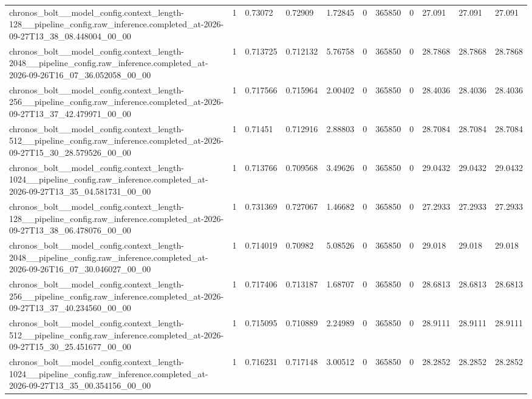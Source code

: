 \begin{tabular}{lllllllllll}
chronos\_bolt\_\_model\_config.context\_length-128\_\_pipeline\_config.raw\_inference.completed\_at-2026-09-27T13\_38\_08.448004\_00\_00 & 1 & 0.73072 & 0.72909 & 1.72845 & 0 & 365850 & 0 & 27.091 & 27.091 & 27.091 \\
chronos\_bolt\_\_model\_config.context\_length-2048\_\_pipeline\_config.raw\_inference.completed\_at-2026-09-26T16\_07\_36.052058\_00\_00 & 1 & 0.713725 & 0.712132 & 5.76758 & 0 & 365850 & 0 & 28.7868 & 28.7868 & 28.7868 \\
chronos\_bolt\_\_model\_config.context\_length-256\_\_pipeline\_config.raw\_inference.completed\_at-2026-09-27T13\_37\_42.479971\_00\_00 & 1 & 0.717566 & 0.715964 & 2.00402 & 0 & 365850 & 0 & 28.4036 & 28.4036 & 28.4036 \\
chronos\_bolt\_\_model\_config.context\_length-512\_\_pipeline\_config.raw\_inference.completed\_at-2026-09-27T15\_30\_28.579526\_00\_00 & 1 & 0.71451 & 0.712916 & 2.88803 & 0 & 365850 & 0 & 28.7084 & 28.7084 & 28.7084 \\
chronos\_bolt\_\_model\_config.context\_length-1024\_\_pipeline\_config.raw\_inference.completed\_at-2026-09-27T13\_35\_04.581731\_00\_00 & 1 & 0.713766 & 0.709568 & 3.49626 & 0 & 365850 & 0 & 29.0432 & 29.0432 & 29.0432 \\
chronos\_bolt\_\_model\_config.context\_length-128\_\_pipeline\_config.raw\_inference.completed\_at-2026-09-27T13\_38\_06.478076\_00\_00 & 1 & 0.731369 & 0.727067 & 1.46682 & 0 & 365850 & 0 & 27.2933 & 27.2933 & 27.2933 \\
chronos\_bolt\_\_model\_config.context\_length-2048\_\_pipeline\_config.raw\_inference.completed\_at-2026-09-26T16\_07\_30.046027\_00\_00 & 1 & 0.714019 & 0.70982 & 5.08526 & 0 & 365850 & 0 & 29.018 & 29.018 & 29.018 \\
chronos\_bolt\_\_model\_config.context\_length-256\_\_pipeline\_config.raw\_inference.completed\_at-2026-09-27T13\_37\_40.234560\_00\_00 & 1 & 0.717406 & 0.713187 & 1.68707 & 0 & 365850 & 0 & 28.6813 & 28.6813 & 28.6813 \\
chronos\_bolt\_\_model\_config.context\_length-512\_\_pipeline\_config.raw\_inference.completed\_at-2026-09-27T15\_30\_25.451677\_00\_00 & 1 & 0.715095 & 0.710889 & 2.24989 & 0 & 365850 & 0 & 28.9111 & 28.9111 & 28.9111 \\
chronos\_bolt\_\_model\_config.context\_length-1024\_\_pipeline\_config.raw\_inference.completed\_at-2026-09-27T13\_35\_00.354156\_00\_00 & 1 & 0.716231 & 0.717148 & 3.00512 & 0 & 365850 & 0 & 28.2852 & 28.2852 & 28.2852 \\

\end{tabular}
